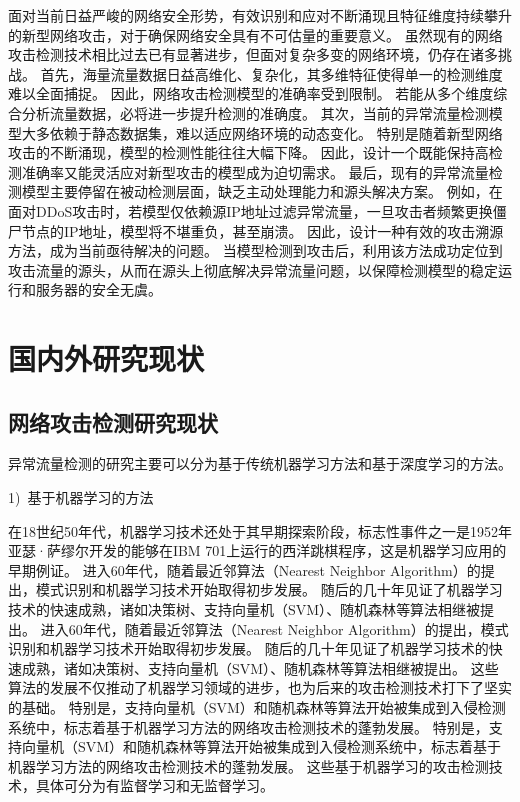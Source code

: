 面对当前日益严峻的网络安全形势，有效识别和应对不断涌现且特征维度持续攀升的新型网络攻击，对于确保网络安全具有不可估量的重要意义。
虽然现有的网络攻击检测技术相比过去已有显著进步，但面对复杂多变的网络环境，仍存在诸多挑战。
首先，海量流量数据日益高维化、复杂化，其多维特征使得单一的检测维度难以全面捕捉。
因此，网络攻击检测模型的准确率受到限制。
若能从多个维度综合分析流量数据，必将进一步提升检测的准确度。
其次，当前的异常流量检测模型大多依赖于静态数据集，难以适应网络环境的动态变化。
特别是随着新型网络攻击的不断涌现，模型的检测性能往往大幅下降。
因此，设计一个既能保持高检测准确率又能灵活应对新型攻击的模型成为迫切需求。
最后，现有的异常流量检测模型主要停留在被动检测层面，缺乏主动处理能力和源头解决方案。
例如，在面对DDoS攻击时，若模型仅依赖源IP地址过滤异常流量，一旦攻击者频繁更换僵尸节点的IP地址，模型将不堪重负，甚至崩溃。
因此，设计一种有效的攻击溯源方法，成为当前亟待解决的问题。
当模型检测到攻击后，利用该方法成功定位到攻击流量的源头，从而在源头上彻底解决异常流量问题，以保障检测模型的稳定运行和服务器的安全无虞。

\section{国内外研究现状}

\subsection{网络攻击检测研究现状}
异常流量检测的研究主要可以分为基于传统机器学习方法和基于深度学习的方法。\par
1)~基于机器学习的方法\par
在18世纪50年代，机器学习技术还处于其早期探索阶段，标志性事件之一是1952年亚瑟·萨缪尔开发的能够在IBM 701上运行的西洋跳棋程序，这是机器学习应用的早期例证。
进入60年代，随着最近邻算法（Nearest Neighbor Algorithm）\cite{taunk2019brief}的提出，模式识别和机器学习技术开始取得初步发展。
随后的几十年见证了机器学习技术的快速成熟，诸如决策树\cite{charbuty2021classification}、支持向量机（SVM）\cite{zhang2021support}、随机森林\cite{athey2019generalized}等算法相继被提出。
进入60年代，随着最近邻算法（Nearest Neighbor Algorithm）\cite{taunk2019brief}的提出，模式识别和机器学习技术开始取得初步发展。
随后的几十年见证了机器学习技术的快速成熟，诸如决策树\cite{charbuty2021classification}、支持向量机（SVM）\cite{zhang2021support}、随机森林\cite{athey2019generalized}等算法相继被提出。
这些算法的发展不仅推动了机器学习领域的进步，也为后来的攻击检测技术打下了坚实的基础。
特别是，支持向量机（SVM）和随机森林等算法开始被集成到入侵检测系统中，标志着基于机器学习方法的网络攻击检测技术的蓬勃发展\cite{amaran2021intrusion}。
特别是，支持向量机（SVM）和随机森林等算法开始被集成到入侵检测系统中，标志着基于机器学习方法的网络攻击检测技术的蓬勃发展\cite{amaran2021intrusion}。
这些基于机器学习的攻击检测技术，具体可分为有监督学习和无监督学习。



